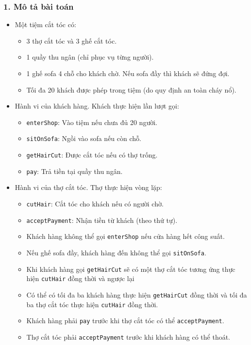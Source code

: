 \subsubsection*{1. Mô tả bài toán}
\begin{itemize}
    \item Một tiệm cắt tóc có:
    \begin{itemize}
        \item 3 thợ cắt tóc và 3 ghế cắt tóc.
        \item 1 quầy thu ngân (chỉ phục vụ từng người).
        \item 1 ghế sofa 4 chỗ cho khách chờ. Nếu sofa đầy thì khách sẽ đứng đợi.
        \item Tối đa 20 khách được phép trong tiệm (do quy định an toàn cháy nổ).
    \end{itemize}
    \item Hành vi của khách hàng. Khách thực hiện lần lượt gọi:
    \begin{itemize}
        \item \texttt{enterShop}: Vào tiệm nếu chưa đủ 20 người.
        \item \texttt{sitOnSofa}: Ngồi vào sofa nếu còn chỗ.
        \item \texttt{getHairCut}: Được cắt tóc nếu có thợ trống.
        \item \texttt{pay}: Trả tiền tại quầy thu ngân.
    \end{itemize}
    \item Hành vi của thợ cắt tóc. Thợ thực hiện vòng lặp:
    \begin{itemize}
        \item \texttt{cutHair}: Cắt tóc cho khách nếu có người chờ.
        \item \texttt{acceptPayment}: Nhận tiền từ khách (theo thứ tự).
    \item Khách hàng không thể gọi \texttt{enterShop} nếu cửa hàng hết công suất.
    \item Nếu ghế sofa đầy, khách hàng đến không thể gọi \texttt{sitOnSofa}.
    \item Khi khách hàng gọi \texttt{getHairCut} sẽ có một thợ cắt tóc tương ứng thực hiện \texttt{cutHair} đồng thời và ngược lại
    \item Có thể có tối đa ba khách hàng thực hiện \texttt{getHairCut} đồng thời và tối đa ba thợ cắt tóc thực hiện \texttt{cutHair} đồng thời.
    \item Khách hàng phải \texttt{pay} trước khi thợ cắt tóc có thể \texttt{acceptPayment}.
    \item Thợ cắt tóc phải \texttt{acceptPayment} trước khi khách hàng có thể thoát.
    \end{itemize}
\end{itemize}
